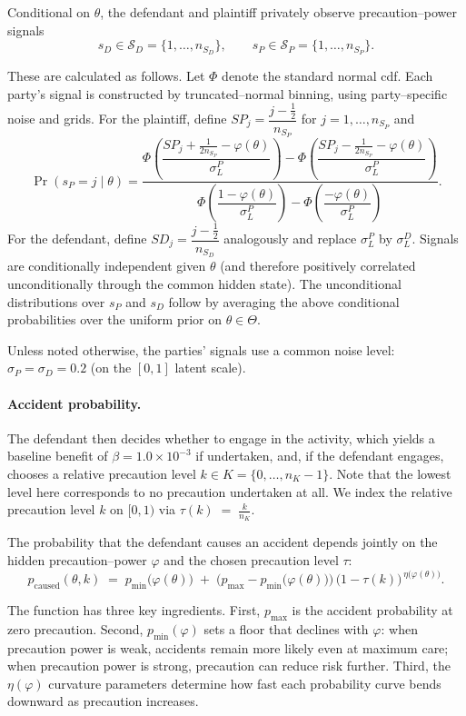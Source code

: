 \documentclass{article}
\begin{document}
Conditional on $\theta$, the defendant and plaintiff privately observe precaution–power signals
\[
s_D\in\mathcal{S}_D=\{1,\dots,n_{S_D}\},\qquad
s_P\in\mathcal{S}_P=\{1,\dots,n_{S_P}\}.
\]

These are calculated as follows. Let $\Phi$ denote the standard normal cdf. Each party’s signal is constructed by truncated–normal binning, using party–specific noise and grids. For the plaintiff, define $SP_j=\dfrac{j-\tfrac12}{n_{S_P}}$ for $j=1,\dots,n_{S_P}$ and
\[
\Pr(s_P=j\mid \theta)
=
\frac{
\Phi\!\left(\dfrac{SP_j+\tfrac{1}{2n_{S_P}}-\varphi(\theta)}{\sigma_L^{P}}\right)
-
\Phi\!\left(\dfrac{SP_j-\tfrac{1}{2n_{S_P}}-\varphi(\theta)}{\sigma_L^{P}}\right)
}{
\Phi\!\left(\dfrac{1-\varphi(\theta)}{\sigma_L^{P}}\right)
-
\Phi\!\left(\dfrac{-\varphi(\theta)}{\sigma_L^{P}}\right)
}.
\]
For the defendant, define $SD_j=\dfrac{j-\tfrac12}{n_{S_D}}$ analogously and replace $\sigma_L^{P}$ by $\sigma_L^{D}$. Signals are conditionally independent given $\theta$ (and therefore positively correlated unconditionally through the common hidden state). The unconditional distributions over $s_P$ and $s_D$ follow by averaging the above conditional probabilities over the uniform prior on $\theta\in\Theta$. 

Unless noted otherwise, the parties' signals use a common noise level:
$\sigma_P = \sigma_D = 0.2$ (on the $[0,1]$ latent scale). 

\paragraph{Accident probability.}

The defendant then decides whether to engage in the activity, which yields a baseline benefit of $\beta = 1.0 \times 10^{-3}$ if undertaken, and, if the defendant engages, chooses a relative precaution level $k \in K = \{0,\dots,n_K-1\}$. Note that the lowest level here corresponds to no precaution undertaken at all. We index the relative precaution level $k$ on $[0,1)$ via $\tau(k) \;=\; \frac{k}{n_K }$.

The probability that the defendant causes an accident depends jointly on the hidden precaution–power $\varphi$ and the chosen precaution level $\tau$:
\[
p_{\mathrm{caused}}(\theta,k)
\;=\;
p_{\min}\!\bigl(\varphi(\theta)\bigr)
\;+\;
\bigl(p_{\max}-p_{\min}\!\bigl(\varphi(\theta)\bigr)\bigr)\,
\bigl(1-\tau(k)\bigr)^{\,\eta\!\bigl(\varphi(\theta)\bigr)}.
\]

The function has three key ingredients. First, $p_{\max}$ is the accident probability at zero precaution. Second, $p_{\min}(\varphi)$ sets a floor that declines with $\varphi$: when precaution power is weak, accidents remain more likely even at maximum care; when precaution power is strong, precaution can reduce risk further. Third, the  $\eta(\varphi)$ curvature parameters determine how fast each probability curve bends downward as precaution increases.
\end{document}
